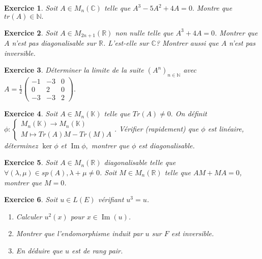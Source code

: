\documentclass[12pt,a4paper]{article}
\newcommand{\R}{\mathbb{R}}
\newcommand{\C}{\mathbb{C}}
\newcommand{\K}{\mathbb{K} }
\DeclareMathOperator{\Ima }{Im}
\theoremstyle{break}
\theoremstyle{break}
\newtheorem{Exo}{Exercice}
\begin{document}
 \begin{Exo}
 	Soit $A\in M_{n}\left( \mathbb{C}\right) $ telle que $%
A^{3}-5A^{2}+4A=0.$ Montre que $tr\left( A\right) \in \mathbb{N}.$

 \end{Exo}

\begin{Exo}
	Soit $A\in M_{2n+1}(\R)$ non nulle telle que $A^3+4A=0$. Montrer que $A$ n'est pas diagonalisable sur $\R$. L'est-elle sur $\C$? Montrer aussi que $A$ n'est pas inversible.
\end{Exo}

\begin{Exo}
	D\'{e}terminer la limite de la suite $\left( A^{n}\right) _{n\in 
		\mathbb{N}}$ avec $A=\frac{1}{2}\left( 
	\begin{array}{ccc}
		-1 & -3 & 0 \\ 
		0 & 2 & 0 \\ 
		-3 & -3 & 2%
	\end{array}%
	\right) .$
\end{Exo}

\begin{Exo}
	Soit $A\in M_{n}\left(\K\right) $ telle que $Tr\left(
	A\right) \neq 0.$ On d\'{e}finit $\phi :\begin{cases}
M_{n}\left( \mathbb{K}\right) \rightarrow M_{n}\left( \mathbb{K}\right) \\ 
M\mapsto Tr\left( A\right) M-Tr\left( M\right) A
	\end{cases}$.	
	V\'{e}rifier (rapidement) que $\phi $ est lin\'{e}aire, d\'{e}terminez $\ker
	\phi $ et $\Ima \phi ,$ montrer que $\phi $ est diagonalisable.
\end{Exo}

\begin{Exo}
	Soit $A\in M_n(\R)$ diagonalisable telle que $\forall(\lambda,\mu)\in sp(A),\lambda+\mu\neq 0$. Soit $M\in M_n(\R)$ telle que $AM+MA=0$, montrer que $M=0$.
\end{Exo}

\begin{Exo}
	Soit $u\in L(E)$ vérifiant $u^3=u$.
	\begin{enumerate}
		\item
		Calculer $u^2(x)$ pour $x\in \Ima(u)$.
		\item
		Montrer que l'endomorphisme induit par $u$ sur $F$ est inversible.
		\item En déduire que $u$ est de rang pair.
	\end{enumerate}
\end{Exo}
\end{document}
